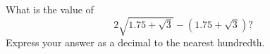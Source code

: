 What is the value of
\[
2\sqrt{1.75+\sqrt3}-\left(1.75+\sqrt3\right)?
\]
Express your answer as a decimal to the nearest hundredth.
